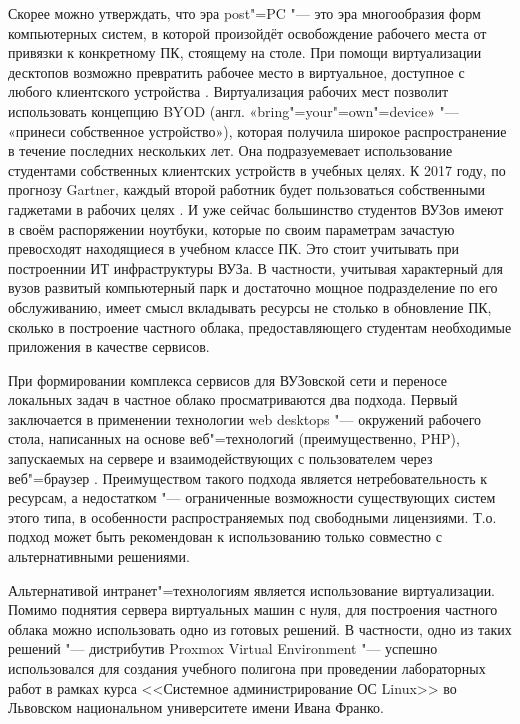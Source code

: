 \documentclass[10pt, a5paper]{article}
\begin{document}
Скорее можно утверждать, что эра post"=PC "--- это эра многообразия форм компьютерных систем, в которой произойдёт освобождение рабочего места от привязки к конкретному ПК, стоящему на столе. При помощи виртуализации десктопов возможно превратить рабочее место в виртуальное, доступное с любого клиентского устройства \cite{Vank6}.  Виртуализация рабочих мест позволит использовать концепцию BYOD (англ. «bring"=your"=own"=device» "--- «принеси собственное устройство»), которая получила широкое распространение в течение последних нескольких лет. Она подразуемевает использование студентами собственных клиентских устройств в учебных целях. К 2017 году, по прогнозу Gartner, каждый второй работник будет пользоваться собственными гаджетами в рабочих целях \cite{Vank7}. И уже сейчас большинство студентов ВУЗов имеют в своём распоряжении ноутбуки, которые по своим параметрам зачастую превосходят находящиеся в учебном классе ПК. Это стоит учитывать при построеннии ИТ инфраструктуры ВУЗа. В частности, учитывая характерный для вузов развитый компьютерный парк и достаточно мощное подразделение по его обслуживанию, имеет смысл вкладывать ресурсы не столько в обновление ПК, сколько в построение частного облака, предоставляющего студентам необходимые приложения в качестве сервисов.

При формировании комплекса сервисов для ВУЗовской сети и переносе локальных задач в частное облако просматриваются два подхода. Первый заключается в применении технологии web desktops "--- окружений рабочего стола, написанных на основе веб"=технологий (преимущественно, PHP), запускаемых на сервере и взаимодействующих с пользователем через веб"=браузер \cite{Vank8}. Преимуществом такого подхода является нетребовательность к ресурсам, а недостатком "--- ограниченные возможности существующих систем этого типа, в особенности распространяемых под свободными лицензиями. Т.о. подход может быть рекомендован к использованию только совместно с альтернативными решениями.

Альтернативой интранет"=технологиям является использование виртуализации. Помимо поднятия сервера виртуальных машин с нуля, для построения частного облака можно использовать одно из готовых решений. В частности, одно из таких решений "--- дистрибутив Proxmox Virtual Environment \cite{Vank9} \cite{Vank10} "--- успешно использовался для создания учебного полигона при проведении лабораторных работ в рамках курса <<Системное администрирование ОС Linux>> во Львовском национальном университете имени Ивана Франко\cite{Vank11}.
\end{document}
